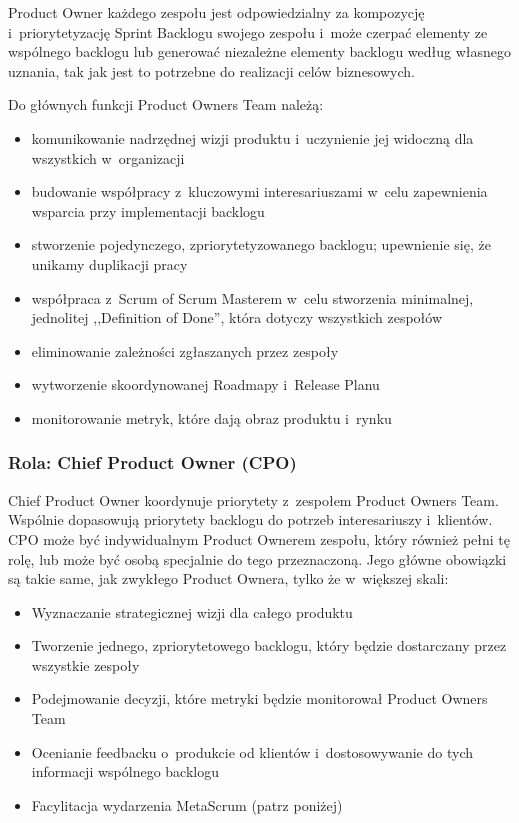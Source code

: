 \documentclass[12pt,a4paper,parskip=full]{scrartcl}
\begin{document}
Product Owner każdego zespołu jest odpowiedzialny za kompozycję i~priorytetyzację Sprint Backlogu swojego zespołu i~może czerpać elementy ze wspólnego backlogu lub generować niezależne elementy backlogu według własnego uznania, tak jak jest to potrzebne do realizacji celów biznesowych.

Do głównych funkcji Product Owners Team należą:

\begin{itemize}
\itemsep1pt\parskip0pt
\item
  komunikowanie nadrzędnej wizji produktu i~uczynienie jej widoczną dla wszystkich w~organizacji
\item
  budowanie współpracy z~kluczowymi interesariuszami w~celu zapewnienia wsparcia przy implementacji backlogu
\item
  stworzenie pojedynczego, zpriorytetyzowanego backlogu; upewnienie się, że unikamy duplikacji pracy
\item
  współpraca z~Scrum of Scrum Masterem w~celu stworzenia minimalnej, jednolitej ,,Definition of Done'', która dotyczy wszystkich zespołów
\item
  eliminowanie zależności zgłaszanych przez zespoły
\item
  wytworzenie skoordynowanej Roadmapy i~Release Planu
\item
  monitorowanie metryk, które dają obraz produktu i~rynku
\end{itemize}

\subsubsection{Rola: Chief Product Owner (CPO)}\label{role-the-chief-product-owner}

Chief Product Owner koordynuje priorytety z~zespołem Product Owners Team. Wspólnie dopasowują priorytety backlogu do potrzeb interesariuszy i~klientów. CPO może być indywidualnym Product Ownerem zespołu, który również pełni tę rolę, lub może być osobą specjalnie do tego przeznaczoną. Jego główne obowiązki są takie same, jak zwykłego Product Ownera, tylko że w~większej skali:

\begin{itemize}
\itemsep1pt\parskip0pt
\item
  Wyznaczanie strategicznej wizji dla całego produktu
\item
  Tworzenie jednego, zpriorytetowego backlogu, który będzie dostarczany przez wszystkie zespoły
\item
  Podejmowanie decyzji, które metryki będzie monitorował Product Owners Team
\item
  Ocenianie feedbacku o~produkcie od klientów i~dostosowywanie do tych informacji wspólnego backlogu
\item
  Facylitacja wydarzenia MetaScrum (patrz poniżej)
\end{itemize}
\end{document}
